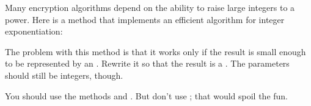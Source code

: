 \begin{exercise}  %

Many encryption algorithms depend on the ability to raise large integers to a power.
Here is a method that implements an efficient algorithm for integer exponentiation:


The problem with this method is that it works only if the result is small enough to be represented by an .
Rewrite it so that the result is a .
The parameters should still be integers, though.

You should use the  methods  and .
But don't use ; that would spoil the fun.

\end{exercise}



